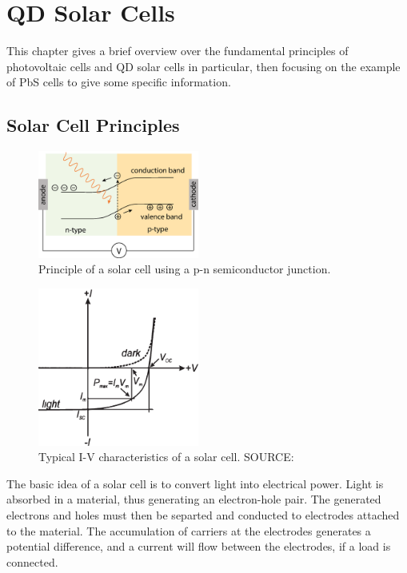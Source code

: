 \chapter{QD Solar Cells}

This chapter gives a brief overview over the fundamental principles of photovoltaic cells and QD solar cells in particular, then focusing on the example of PbS cells to give some specific information.

\section{Solar Cell Principles}

\begin{figure}
	\centering
	\includegraphics[width=200px]{Fig/SolarCell/pnSolarCell}
	\caption{Principle of a solar cell using a p-n semiconductor junction.}
	\label{fig:pnSolarCell}
\end{figure}

\begin{figure}
	\centering
	\includegraphics[width=200px]{Fig/SolarCell/IVsolarCell}
	\caption{Typical I-V characteristics of a solar cell. SOURCE: \cite[p.427]{ChemRev}}
	\label{fig:IVsolarCell}
\end{figure}

The basic idea of a solar cell is to convert light into electrical power. Light is absorbed in a material, thus generating an electron-hole pair. The generated electrons and holes must then be separted and conducted to electrodes attached to the material. The accumulation of carriers at the electrodes generates a potential difference, and a current will flow between the electrodes, if a load is connected.

